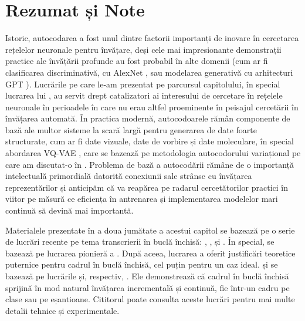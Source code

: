 \documentclass[../../book-main_ro.tex]{subfiles}
\begin{document}
\section{Rezumat și Note}
Istoric, autocodarea a fost unul dintre factorii importanți de inovare în cercetarea
rețelelor neuronale pentru învățare, deși cele mai impresionante demonstrații practice
ale învățării profunde au fost probabil în alte domenii
(cum ar fi clasificarea discriminativă, cu AlexNet
\cite{krizhevsky2012imagenet}, sau modelarea generativă cu arhitecturi GPT
\cite{brown2020language}).
Lucrările pe care le-am prezentat pe parcursul capitolului, în special lucrarea lui
\cite{Hinton504}, au servit drept catalizatori ai interesului de cercetare în rețelele neuronale
în perioadele în care nu erau altfel proeminente în peisajul cercetării în învățarea automată.
În practica modernă, autocodoarele rămân componente de bază ale multor sisteme la scară largă
pentru generarea de date foarte structurate, cum ar fi date vizuale, date de vorbire
și date moleculare, în special abordarea VQ-VAE
\cite{van-den-Oord2017-jr}, care se bazează pe metodologia autocodorului variațional
pe care am discutat-o în .
Problema de bază a autocodării rămâne de o importanță intelectuală primordială
datorită conexiunii sale strânse cu învățarea reprezentărilor și anticipăm că
va reapărea pe radarul cercetătorilor practici în viitor pe măsură ce
eficiența în antrenarea și implementarea modelelor mari continuă să devină mai
importantă.

Materialele prezentate în a doua jumătate a acestui capitol se bazează pe o serie de
lucrări recente pe tema transcrierii în buclă închisă: \cite{Dai-entropy-2022},
\cite{pai2022pursuit}, \cite{tong2023incremental} și \cite{pmlr-v234-tong24a}. În special,  se bazează pe lucrarea pionieră a \cite{Dai-entropy-2022}. După aceea, lucrarea \cite{pai2022pursuit} a oferit justificări teoretice puternice pentru cadrul în buclă închisă, cel puțin pentru un caz ideal.  și  se bazează pe lucrările \cite{tong2023incremental} și, respectiv, \cite{pmlr-v234-tong24a}. Ele demonstrează că cadrul în buclă închisă sprijină în mod natural învățarea incrementală și continuă, fie într-un cadru pe clase sau pe eșantioane. Cititorul poate consulta aceste lucrări pentru mai multe detalii tehnice și experimentale.
\end{document}
